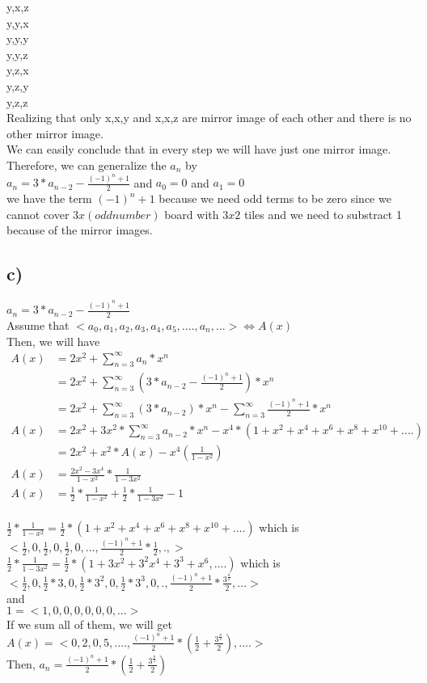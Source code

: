 \documentclass[12pt]{article}
\begin{document}
y,x,z \\
y,y,x \\
y,y,y \\
y,y,z \\
y,z,x \\
y,z,y \\
y,z,z \\
Realizing that only x,x,y and x,x,z are mirror image of each other and there is no other mirror image. \\
We can easily conclude that in every step we will have just one mirror image. Therefore, we can generalize the $a_n$ by \\
$a_n = 3*a_{n-2} - \frac{(-1)^n + 1}{2}$ and $a_0=0$ and $a_1=0$ \\ we have the term $(-1)^n + 1$ because we need odd terms to be zero since we cannot cover $3x(odd number)$ board with $3x2$ tiles and we need to substract 1 because of the mirror images.
\subsection*{c)}
$a_n = 3*a_{n-2} - \frac{(-1)^n + 1}{2}$ \\
Assume that $<a_0,a_1,a_2,a_3,a_4,a_5,....,a_n,...> \Longleftrightarrow A(x)$ \\
Then, we will have \\
\begin{align*}
A(x) &= 2x^2 + \sum\limits_{n=3}^{\infty} a_n*x^n \\
&=2x^2 + \sum\limits_{n=3}^{\infty}(3*a_{n-2} - \frac{(-1)^n + 1}{2})*x^n \\
&= 2x^2 + \sum\limits_{n=3}^{\infty}(3*a_{n-2})*x^n - \sum\limits_{n=3}^{\infty}\frac{(-1)^n + 1}{2}*x^n \\
A(x) &= 2x^2 + 3x^2*\sum\limits_{n=3}^{\infty}a_{n-2}*x^n - x^4*(1+x^2+x^4+x^6+x^8+x^10+....) \\
&=2x^2+x^2*A(x) - x^4(\frac{1}{1-x^2}) \\
A(x) &= \frac{2x^2-3x^4}{1-x^2}*\frac{1}{1-3x^2} \\ 
A(x) &= \frac{1}{2}*\frac{1}{1-x^2}+\frac{1}{2}*\frac{1}{1-3x^2} - 1 \\
\end{align*}

$\frac{1}{2}*\frac{1}{1-x^2} = \frac{1}{2}*(1+x^2+x^4+x^6+x^8+x^10+....)$ which is $<\frac{1}{2},0,\frac{1}{2},0,\frac{1}{2},0,...,\frac{(-1)^n + 1}{2}*\frac{1}{2},.,>$ \\

$\frac{1}{2}*\frac{1}{1-3x^2} = \frac{1}{2} * (1+3x^2+3^2x^4+3^3+x^6,....)$ which is $<\frac{1}{2},0,\frac{1}{2}*3,0,\frac{1}{2}*3^2,0,\frac{1}{2}*3^3,0,.,\frac{(-1)^n + 1}{2}*\frac{3^{\frac{n}{2}}}{2},...>$ \\
and \\
$1 = <1,0,0,0,0,0,0,...>$ \\
If we sum all of them, we will get \\
$A(x) = <0,2,0,5,....,\frac{(-1)^n + 1}{2}*(\frac{1}{2}+\frac{3^{\frac{n}{2}}}{2}),....>$ \\
Then, $a_n = \frac{(-1)^n + 1}{2}*(\frac{1}{2}+\frac{3^{\frac{n}{2}}}{2})$
\end{document}
